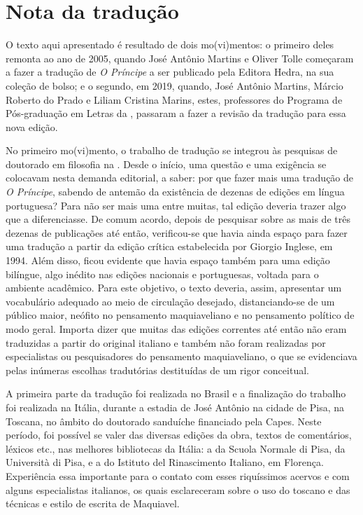 \chapter{Nota da tradução}

O texto aqui apresentado é resultado de dois mo(vi)mentos: o primeiro
deles remonta ao ano de 2005, quando José Antônio Martins e Oliver Tolle
começaram a fazer a tradução de \emph{O Príncipe} a ser publicado pela
Editora Hedra, na sua coleção de bolso; e o segundo, em 2019, quando,
José Antônio Martins, Márcio Roberto do Prado e Liliam Cristina Marins,
estes, professores do Programa de Pós-graduação em Letras da ,
passaram a fazer a revisão da tradução para essa nova edição.

No primeiro mo(vi)mento, o trabalho de tradução se integrou às pesquisas
de doutorado em filosofia na . Desde o início, uma questão e uma
exigência se colocavam nesta demanda editorial, a saber: por que fazer
mais uma tradução de \emph{O Príncipe}, sabendo de antemão da existência
de dezenas de edições em língua portuguesa? Para não ser mais uma entre
muitas, tal edição deveria trazer algo que a diferenciasse. De comum
acordo, depois de pesquisar sobre as mais de três dezenas de publicações
até então, verificou-se que havia ainda espaço para fazer uma tradução a
partir da edição crítica estabelecida por Giorgio Inglese, em 1994. Além
disso, ficou evidente que havia espaço também para uma edição bilíngue,
algo inédito nas edições nacionais e portuguesas, voltada para o
ambiente acadêmico. Para este objetivo, o texto deveria, assim,
apresentar um vocabulário adequado ao meio de circulação desejado,
distanciando-se de um público maior, neófito no pensamento maquiaveliano
e no pensamento político de modo geral. Importa dizer que muitas das
edições correntes até então não eram traduzidas a partir do original
italiano e também não foram realizadas por especialistas ou
pesquisadores do pensamento maquiaveliano, o que se evidenciava pelas
inúmeras escolhas tradutórias destituídas de um rigor conceitual.

A primeira parte da tradução foi realizada no Brasil e a finalização do
trabalho foi realizada na Itália, durante a estadia de José Antônio na
cidade de Pisa, na Toscana, no âmbito do doutorado sanduíche financiado
pela Capes. Neste período, foi possível se valer das diversas edições da
obra, textos de comentários, léxicos etc., nas melhores bibliotecas da
Itália: a da Scuola Normale di Pisa, da Università di Pisa, e a do
Istituto del Rinascimento Italiano, em Florença. Experiência essa
importante para o contato com esses riquíssimos acervos e com alguns
especialistas italianos, os quais esclareceram sobre o uso do toscano e
das técnicas e estilo de escrita de Maquiavel.

